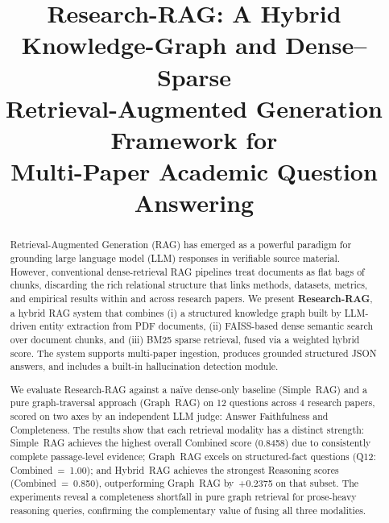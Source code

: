 \documentclass[conference]{IEEEtran}
\begin{document}
\title{Research-RAG: A Hybrid Knowledge-Graph and Dense--Sparse\\
Retrieval-Augmented Generation Framework for\\
Multi-Paper Academic Question Answering}

\author{
}

\maketitle

\begin{abstract}
Retrieval-Augmented Generation (RAG) has emerged as a powerful paradigm
for grounding large language model (LLM) responses in verifiable source
material. However, conventional dense-retrieval RAG pipelines treat
documents as flat bags of chunks, discarding the rich relational structure
that links methods, datasets, metrics, and empirical results within and
across research papers. We present \textbf{Research-RAG}, a hybrid RAG
system that combines (i) a structured knowledge graph built by LLM-driven
entity extraction from PDF documents, (ii) FAISS-based dense semantic
search over document chunks, and (iii) BM25 sparse retrieval, fused via a
weighted hybrid score. The system supports multi-paper ingestion, produces
grounded structured JSON answers, and includes a built-in hallucination
detection module.

We evaluate Research-RAG against a na{\"i}ve dense-only baseline
(Simple~RAG) and a pure graph-traversal approach (Graph~RAG) on 12
questions across 4 research papers, scored on two axes by an independent
LLM judge: Answer Faithfulness and Completeness.
The results show that each retrieval modality has a distinct strength:
Simple~RAG achieves the highest overall Combined score (0.8458) due to
consistently complete passage-level evidence; Graph~RAG excels on
structured-fact questions (Q12: Combined~=~1.00); and Hybrid~RAG
achieves the strongest Reasoning scores (Combined~=~0.850), outperforming
Graph~RAG by~+0.2375 on that subset.
The experiments reveal a completeness shortfall in pure graph retrieval
for prose-heavy reasoning queries, confirming the complementary value of
fusing all three modalities.
\end{abstract}
\end{document}
